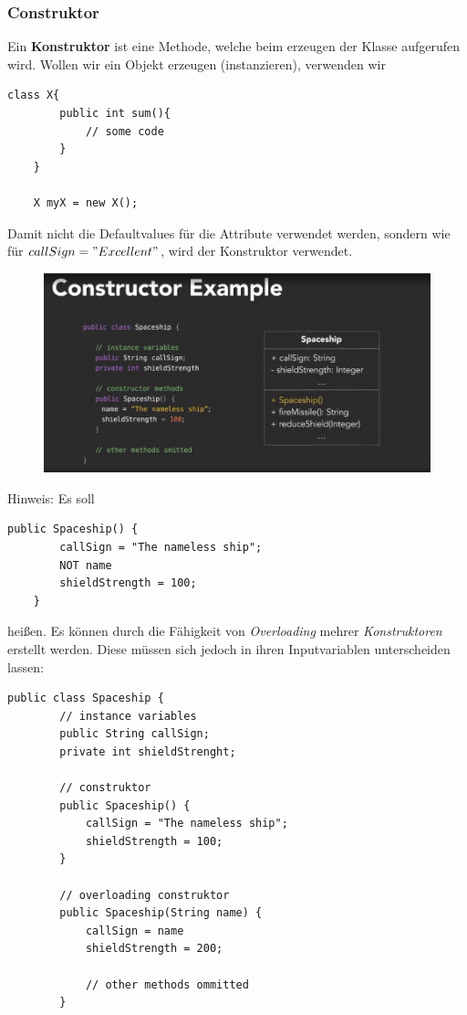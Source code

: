 \subsubsection{Construktor}
Ein \textbf{Konstruktor} ist eine Methode, welche beim erzeugen der Klasse aufgerufen wird.
Wollen wir ein Objekt erzeugen (instanzieren), verwenden wir
\begin{lstlisting}[style=C++]
	class X{
		public int sum(){
			// some code
		}
	}
	
	X myX = new X();
\end{lstlisting}
Damit nicht die Defaultvalues für die Attribute verwendet werden, sondern wie für $callSign = "Excellent"$, wird der Konstruktor verwendet.
\begin{figure}[H]
	\centering
	\includegraphics[scale = 0.3]{attachment/chapter_2/Scc012}
	\caption{}
	\label{fig:Scc012}
\end{figure}
Hinweis: Es soll 
\begin{lstlisting}[style=C++]
	public Spaceship() {
		callSign = "The nameless ship";
		NOT name
		shieldStrength = 100;
	}
\end{lstlisting}
heißen. Es können durch die Fähigkeit von \textit{Overloading} mehrer \textit{Konstruktoren} erstellt werden. Diese müssen sich jedoch in ihren Inputvariablen unterscheiden lassen:

\begin{lstlisting}[style=C++]
	public class Spaceship {
		// instance variables
		public String callSign;
		private int shieldStrenght;
		
		// construktor
		public Spaceship() {
			callSign = "The nameless ship";
			shieldStrength = 100;
		}
		
		// overloading construktor
		public Spaceship(String name) {
			callSign = name
			shieldStrength = 200;
			
			// other methods ommitted
		}	
\end{lstlisting}

